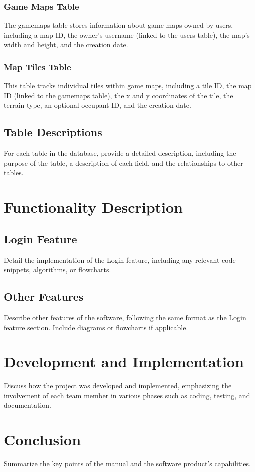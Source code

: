 \documentclass[12pt]{article}
\begin{document}
\subsubsection{Game Maps Table}
The game\textunderscore maps table stores information about game maps owned by users, including a map ID, the owner's username (linked to the users table), the map's width and height, and the creation date.

\subsubsection{Map Tiles Table}
This table tracks individual tiles within game maps, including a tile ID, the map ID (linked to the game\textunderscore maps table), the x and y coordinates of the tile, the terrain type, an optional occupant ID, and the creation date.

\subsection{Table Descriptions}
For each table in the database, provide a detailed description, including the purpose of the table, a description of each field, and the relationships to other tables.

\section{Functionality Description}
\subsection{Login Feature}
Detail the implementation of the Login feature, including any relevant code snippets, algorithms, or flowcharts.

\subsection{Other Features}
Describe other features of the software, following the same format as the Login feature section. Include diagrams or flowcharts if applicable.

\section{Development and Implementation}
Discuss how the project was developed and implemented, emphasizing the involvement of each team member in various phases such as coding, testing, and documentation.

\section{Conclusion}
Summarize the key points of the manual and the software product's capabilities.
\end{document}
